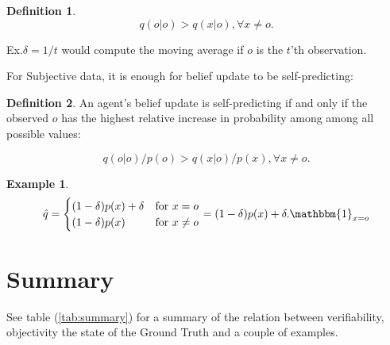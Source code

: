 \documentclass{report}
\theoremstyle{definition}
\newtheorem{definition}{Definition}
\newtheorem{example}[]{Example}
\begin{document}
\begin{itemize}
\begin{definition}
\begin{equation}
    q(o|o) > q(x|o), \forall x \neq o.
\end{equation}
\end{definition}
Ex.$\delta = 1/t$ would compute the moving average if $o$ is the $t$'th observation.

For Subjective data, it is enough for belief update to be self-predicting:
\begin{definition} An agent's belief update is self-predicting if and only if the observed $o$ has the highest relative increase in probability among  among all possible values:


\begin{equation}
    q(o|o)/p(o) > q(x|o)/p(x), \forall x \neq o.
\end{equation}
\end{definition}
\end{itemize}

\begin{example}
\begin{equation}
    \hat{q} = \begin{cases} 
(1-\delta)p(x) + \delta &\text{for } x=o \\
(1 - \delta)p(x)        &\text{for } x\neq o 
\end{cases} = (1 - \delta)p(x) + \delta.\mathbbm{1}_{x=o}
\end{equation}
\end{example}

\section{Summary}
See table (\ref{tab:summary}) for a summary of the relation between verifiability, objectivity the state of the Ground Truth and a couple of examples.
\end{document}
